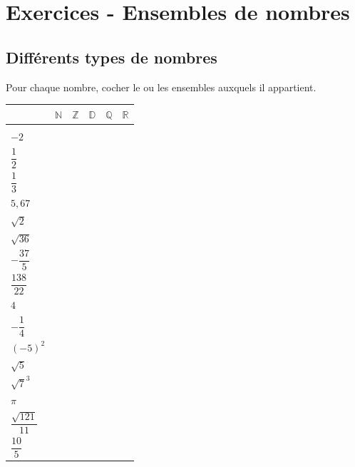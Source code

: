\bigskip

\newpage

\section*{Exercices - Ensembles de nombres}
{\setlength{\columnseprule}{0pt}
\setcounter{NumEx}{1}

\subsection*{Différents types de nombres}


\begin{Exercice} Pour chaque nombre, cocher le ou les ensembles auxquels il appartient.
\begin{center}
\renewcommand{\arraystretch}{2.5}
\begin{tabular}{|>{\centering\arraybackslash}p{2 cm}|>{\centering\arraybackslash}p{2 cm}|>{\centering\arraybackslash}p{2 cm}|>{\centering\arraybackslash}p{2 cm}|>{\centering\arraybackslash}p{2 cm}|>{\centering\arraybackslash}p{2 cm}|}
\arrayrulecolor{Couleur6}\hline 
 & $\mathbb{N}$ & $\mathbb{Z}$ & $\mathbb{D}$ & $\mathbb{Q}$ & $\mathbb{R}$ \\ 
\hline 
3 &  &  &  &  &  \\ 
\hline 
$-2$ &  &  &  &  &  \\ 
\hline 
$\dfrac{1}{2}$ &  &  &  &  &  \\ 
\hline 
$\dfrac{1}{3}$ &  &  &  &  &  \\ 
\hline 
$5,67$ &  &  &  &  &  \\ 
\hline 
$\sqrt{2}$ &  &  &  &  &  \\ 
\hline 
$\sqrt{36}$ &  &  &  &  &  \\ 
\hline 
$-\dfrac{37}{5}$ &  &  &  &  &  \\ 
\hline 
$\dfrac{138}{22}$ &  &  &  &  &  \\ 
\hline 
$4$ &  &  &  &  &  \\ 
\hline 
$-\dfrac{1}{4}$ &  &  &  &  &  \\ 
\hline 
$(-5)^2$ &  &  &  &  &  \\ 
\hline 
$\sqrt{5}$ &  &  &  &  &  \\ 
\hline 
$\sqrt{7}^3$ &  &  &  &  &  \\ 
\hline 
$\pi$ &  &  &  &  &  \\ 
\hline 
$\dfrac{\sqrt{121}}{11}$ &  &  &  &  &  \\ 
\hline 
$\dfrac{10}{5}$ &  &  &  &  &  \\ 
\hline 
\end{tabular} 
\end{center}
\end{Exercice}

}
